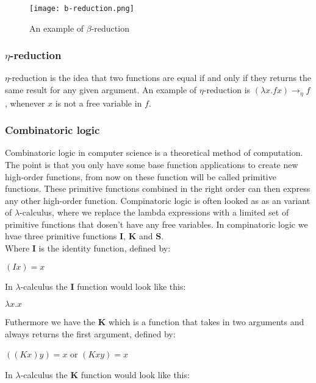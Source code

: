 \begin{figure}
    \centering
    \texttt{[image: b-reduction.png]}
    \caption{An example of $\beta$-reduction}
    \label{fig:beta-reduction}
\end{figure}

\subsubsection{$\eta$-reduction}
$\eta$-reduction is the idea that two functions are equal if and only if they returns the same result for 
any given argument. An example of $\eta$-reduction is $(\lambda x.f x)  \rightarrow_\eta f$, whenever $x$ is not 
a free variable in $f$.

\subsubsection{Combinatoric logic}
Combinatoric logic in computer science is a theoretical method of computation. The point is that you only have some base function
applications to create new high-order functions, from now on these function will be called primitive functions. These primitive functions
combined in the right order can then express any other high-order function.  
Compinatoric logic is often looked as as an variant of $\lambda$-calculus, where 
we replace the lambda expressions with a limited set of primitive functions that dosen't have any free variables. In compinatoric logic
we hvae three primitive functions \textbf{I}, \textbf{K} and \textbf{S}.\\
Where \textbf{I} is the identity function, defined by: \\ 
\begin{center}
    $(I x) = x$\\    
\end{center}
In $\lambda$-calculus the \textbf{I} function would look like this:\\
\begin{center}
    $\lambda x.x$\\    
\end{center}
Futhermore we have the \textbf{K} which is a function that takes in two arguments and always returns the first argument, defined by:
\begin{center}
    $ ((K x) y) = x$ or $(K x y) = x$\\    
\end{center}
In $\lambda$-calculus the \textbf{K} function would look like this:\\
